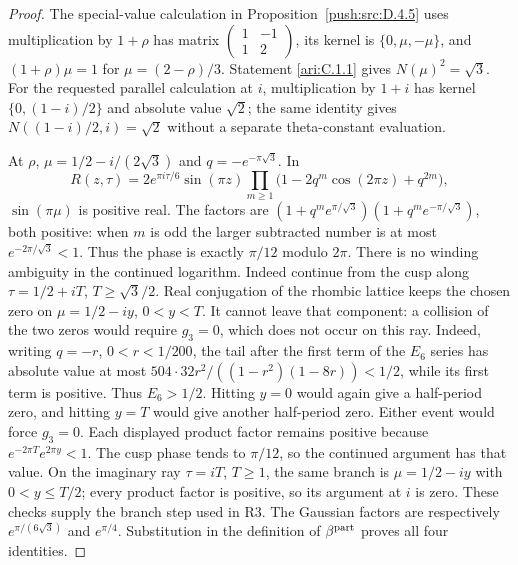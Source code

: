 \begin{proof}
The special-value calculation in Proposition~\ref{push:src:D.4.5}
uses multiplication by $1+\rho$ has matrix
$\left(\begin{smallmatrix}1&-1\\1&2\end{smallmatrix}\right)$,
its kernel is $\{0,\mu,-\mu\}$, and $(1+\rho)\mu=1$ for
$\mu=(2-\rho)/3$. Statement \ref{ari:C.1.1} gives $N(\mu)^2=\sqrt3$.
For the requested parallel calculation at $i$, multiplication by $1+i$
has kernel $\{0,(1-i)/2\}$ and absolute value $\sqrt2$; the same
identity gives $N((1-i)/2,i)=\sqrt2$ without a separate theta-constant
evaluation.

At $\rho$, $\mu=1/2-i/(2\sqrt3)$ and $q=-e^{-\pi\sqrt3}$. In
\[
 R(z,\tau)=2e^{\pi i\tau/6}\sin(\pi z)
 \prod_{m\ge1}\bigl(1-2q^m\cos(2\pi z)+q^{2m}\bigr),
\]
$\sin(\pi\mu)$ is positive real. The factors are
$(1+q^m e^{\pi/\sqrt3})(1+q^m e^{-\pi/\sqrt3})$, both positive:
when $m$ is odd the larger subtracted number is at most
$e^{-2\pi/\sqrt3}<1$. Thus the phase is exactly $\pi/12$ modulo
$2\pi$. There is no winding ambiguity in the continued logarithm.
Indeed continue from the cusp along $\tau=1/2+iT$,
$T\ge\sqrt3/2$. Real conjugation of the rhombic lattice keeps the
chosen zero on $\mu=1/2-iy$, $0<y<T$. It cannot leave that component:
a collision of the two zeros would require $g_3=0$, which does not
occur on this ray. Indeed, writing $q=-r$, $0<r<1/200$,
the tail after the first term of the $E_6$ series has absolute value
at most $504\cdot32r^2/((1-r^2)(1-8r))<1/2$, while its
first term is positive. Thus $E_6>1/2$. Hitting $y=0$ would again give a half-period zero, and
hitting $y=T$ would give another half-period zero. Either event
would force $g_3=0$. Each displayed product factor remains
positive because $e^{-2\pi T}e^{2\pi y}<1$. The cusp phase tends to
$\pi/12$, so the continued argument has that value. On the imaginary
ray $\tau=iT$, $T\ge1$, the same branch is
$\mu=1/2-iy$ with $0<y\le T/2$; every product factor is positive,
so its argument at $i$ is zero. These checks supply the branch step
used in R3. The Gaussian factors are respectively
$e^{\pi/(6\sqrt3)}$ and $e^{\pi/4}$. Substitution in the definition of
$\beta^{\rm part}$ proves all four identities.
\end{proof}

